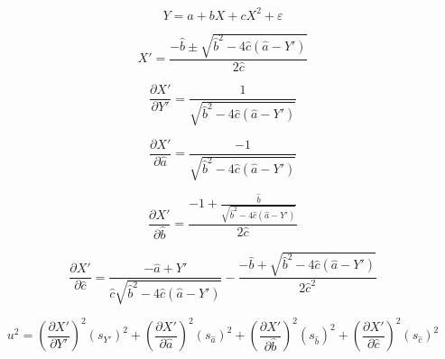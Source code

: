 \documentclass[12pt]{article}
\begin{document}
\pagestyle{empty}
\Large
{}
\pagecolor{ehandbook}

\[
Y = a + bX + cX^{2}+\varepsilon
\]


\[
X' = \frac{-\hat{b} \pm \sqrt{\hat{b}^{2} - 4\hat{c}(\hat{a}-Y')}}{2\hat{c}} 
\]


\[
\frac{\partial{X'}}{\partial{Y'}} = 
\frac{1}{\sqrt{\hat{b}^{2} - 4\hat{c}(\hat{a}-Y')}}
\]

\[
\frac{\partial{X'}}{\partial{\hat{a}}} =
     \frac{-1}{\sqrt{\hat{b}^{2} - 4\hat{c}(\hat{a}-Y')}}
\]


\[
\frac{\partial{X'}}{\partial{\hat{b}}} =
\frac{-1 + \frac{\hat{b}}{\sqrt{\hat{b}^{2} - 4\hat{c}(\hat{a}-Y')}}}{2\hat{c}}
\]


\[
\frac{\partial{X'}}{\partial{\hat{c}}} =
\frac{-\hat{a} + Y'}{\hat{c}\sqrt{\hat{b}^{2} - 4\hat{c}(\hat{a}-Y')}} - 
\frac{-\hat{b} + \sqrt{\hat{b}^{2} - 4\hat{c}(\hat{a}-Y')}}{2\hat{c}^{2}}
\]

\[
u^{2} = \left( \frac{\partial{X'}}{\partial{Y'}}\right) ^{2} (s_{Y'})^{2} + 
\left( \frac{\partial{X'}}{\partial{\hat{a}}}\right) ^{2} (s_{\hat{a}})^{2} + 
\left( \frac{\partial{X'}}{\partial{\hat{b}}}\right) ^{2} (s_{\hat{b}})^{2} +
\left( \frac{\partial{X'}}{\partial{\hat{c}}}\right )^{2} (s_{\hat{c}})^{2}
\]
\end{document}
